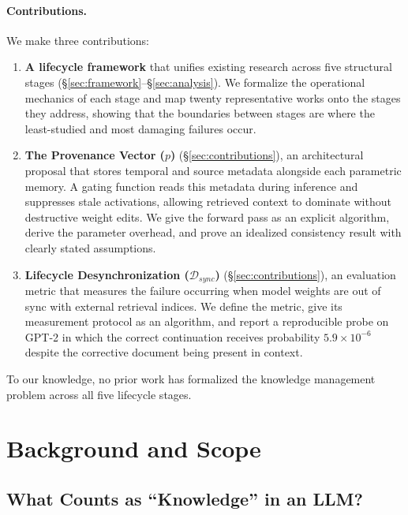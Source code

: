 \documentclass{article}
\begin{document}
\paragraph{Contributions.} We make three contributions:

\begin{enumerate}[leftmargin=*]
  \item \textbf{A lifecycle framework} that unifies existing research across five structural stages (\S\ref{sec:framework}--\S\ref{sec:analysis}). We formalize the operational mechanics of each stage and map twenty representative works onto the stages they address, showing that the boundaries between stages are where the least-studied and most damaging failures occur.

  \item \textbf{The Provenance Vector ($p$)} (\S\ref{sec:contributions}), an architectural proposal that stores temporal and source metadata alongside each parametric memory. A gating function reads this metadata during inference and suppresses stale activations, allowing retrieved context to dominate without destructive weight edits. We give the forward pass as an explicit algorithm, derive the parameter overhead, and prove an idealized consistency result with clearly stated assumptions.

  \item \textbf{Lifecycle Desynchronization ($\mathcal{D}_{sync}$)} (\S\ref{sec:contributions}), an evaluation metric that measures the failure occurring when model weights are out of sync with external retrieval indices. We define the metric, give its measurement protocol as an algorithm, and report a reproducible probe on GPT-2 in which the correct continuation receives probability $5.9 \times 10^{-6}$ despite the corrective document being present in context.
\end{enumerate}

To our knowledge, no prior work has formalized the knowledge management problem across all five lifecycle stages.

\section{Background and Scope}
\label{sec:background}

\subsection{What Counts as ``Knowledge'' in an LLM?}
\end{document}
